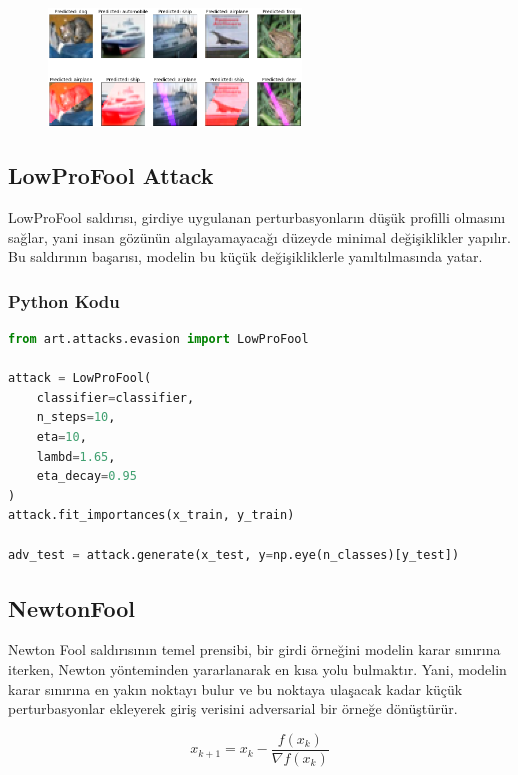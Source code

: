 \begin{figure}[h]
    \centering
    \includegraphics[width=0.6\textwidth]{images/evasion_laser_beam.png}
    \caption{}
\end{figure}

\newpage

\subsection{LowProFool Attack}

LowProFool saldırısı, girdiye uygulanan perturbasyonların düşük profilli olmasını sağlar, yani insan gözünün algılayamayacağı düzeyde minimal değişiklikler yapılır. Bu saldırının başarısı, modelin bu küçük değişikliklerle yanıltılmasında yatar.

\subsubsection{Python Kodu}

\begin{lstlisting}[language=Python]
from art.attacks.evasion import LowProFool

attack = LowProFool(
    classifier=classifier,
    n_steps=10,
    eta=10,
    lambd=1.65,
    eta_decay=0.95
)
attack.fit_importances(x_train, y_train)

adv_test = attack.generate(x_test, y=np.eye(n_classes)[y_test])
\end{lstlisting}

\newpage

\subsection{NewtonFool}

Newton Fool saldırısının temel prensibi, bir girdi örneğini modelin karar sınırına iterken, Newton yönteminden yararlanarak en kısa yolu bulmaktır. Yani, modelin karar sınırına en yakın noktayı bulur ve bu noktaya ulaşacak kadar küçük perturbasyonlar ekleyerek giriş verisini adversarial bir örneğe dönüştürür.

\[ x_{k+1} = x_k - \frac{f(x_k)}{\nabla f(x_k)} \]

